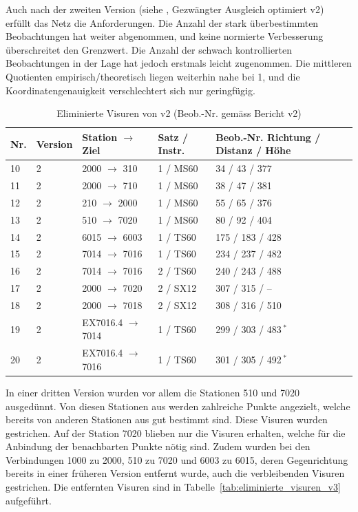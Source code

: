 Auch nach der zweiten Version (siehe , Gezwängter Ausgleich optimiert v2) erfüllt das Netz die Anforderungen. Die Anzahl der stark überbestimmten Beobachtungen hat
weiter abgenommen, und keine normierte Verbesserung überschreitet den Grenzwert. Die Anzahl der schwach kontrollierten
Beobachtungen in der Lage hat jedoch erstmals leicht zugenommen. Die mittleren Quotienten empirisch/theoretisch liegen
weiterhin nahe bei 1, und die Koordinatengenauigkeit verschlechtert sich nur geringfügig.
\begin{table}[H]
    \centering
    \begin{tabular}{p{0.8cm} p{1.2cm} p{3.2cm} p{2.5cm} p{5.3cm}}
        \toprule
        Nr. & Version & Station $\rightarrow$ Ziel & Satz / Instr. & Beob.-Nr. Richtung / Distanz / Höhe \\
        \midrule
        10 & 2 & 2000 $\rightarrow$ 310   & 1 / MS60 & 34 / 43 / 377 \\
        11 & 2 & 2000 $\rightarrow$ 710   & 1 / MS60 & 38 / 47 / 381 \\
        12 & 2 & 210 $\rightarrow$ 2000   & 1 / MS60 & 55 / 65 / 376 \\
        13 & 2 & 510 $\rightarrow$ 7020   & 1 / MS60 & 80 / 92 / 404 \\
        14 & 2 & 6015 $\rightarrow$ 6003  & 1 / TS60 & 175 / 183 / 428 \\
        15 & 2 & 7014 $\rightarrow$ 7016  & 1 / TS60 & 234 / 237 / 482 \\
        16 & 2 & 7014 $\rightarrow$ 7016  & 2 / TS60 & 240 / 243 / 488 \\
        17 & 2 & 2000 $\rightarrow$ 7020  & 2 / SX12 & 307 / 315 / -- \\
        18 & 2 & 2000 $\rightarrow$ 7018  & 2 / SX12 & 308 / 316 / 510 \\
        19 & 2 & EX7016.4 $\rightarrow$ 7014 & 1 / TS60 & 299 / 303 / 483\,$^{*}$ \\
        20 & 2 & EX7016.4 $\rightarrow$ 7016 & 1 / TS60 & 301 / 305 / 492\,$^{*}$ \\
        \bottomrule
    \end{tabular}
    \caption{Eliminierte Visuren von v2 (Beob.-Nr. gemäss Bericht v2)}
    \label{tab:eliminierte_visuren_v2}
\end{table}
\label{sec:v0}
\bigskip
In einer dritten Version wurden vor allem die Stationen 510 und 7020 ausgedünnt. Von diesen Stationen aus werden
zahlreiche Punkte angezielt, welche bereits von anderen Stationen aus gut bestimmt sind. Diese Visuren wurden
gestrichen. Auf der Station 7020 blieben nur die Visuren erhalten, welche für die Anbindung der benachbarten Punkte
nötig sind. Zudem wurden bei den Verbindungen 1000 zu 2000, 510 zu 7020 und 6003 zu 6015, deren Gegenrichtung bereits in
einer früheren Version entfernt wurde, auch die verbleibenden Visuren gestrichen. Die entfernten Visuren sind in
Tabelle~\ref{tab:eliminierte_visuren_v3} aufgeführt.\bigskip

